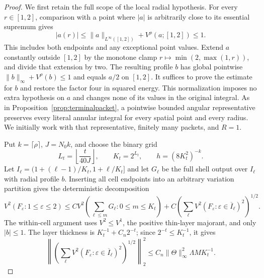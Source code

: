 \documentclass[11pt]{article}
\numberwithin{equation}{section}
\theoremstyle{remark}
\theoremstyle{definition}
\begin{document}
\begin{proof}
We first retain the full scope of the local radial hypothesis.  For
every $r\in[1,2]$, comparison with a point where $|a|$ is arbitrarily
close to its essential supremum gives
\[
 |a(r)|\le\|a\|_{L^\infty([1,2])}+V^\rho(a;[1,2])\le1.
\]
This includes both endpoints and any exceptional point values.  Extend
$a$ constantly outside $[1,2]$ by the monotone clamp
$r\mapsto\min(2,\max(1,r))$, and divide that extension by two.
The resulting profile $b$ has global pointwise
$\|b\|_\infty+V^\rho(b)\le1$ and equals $a/2$ on $[1,2]$.
It suffices to prove the estimate for $b$ and restore the factor four
in squared energy.  This normalization imposes no extra hypothesis
on $a$ and changes none of its values in the original integral.
As in Proposition~\ref{prop:terminalpacket}, a pointwise bounded angular
representative preserves every literal annular integral for every
spatial point and every radius.  We initially work with that
representative, finitely many packets, and $R=1$.

Put $k=\lceil\rho\rceil$, $J=N_0k$, and choose the binary grid
\[
 L_t=\left\lfloor\frac{t}{40J}\right\rfloor,
 \qquad K_t=2^{L_t},\qquad
 h=(8K_t^2)^{-k}.
\]
Let $I_\ell=(1+(\ell-1)/K_t,1+\ell/K_t]$ and let $G_\ell$
be the full shell output over $I_\ell$ with radial profile $b$.
Inserting all cell endpoints into an arbitrary variation partition
gives the deterministic decomposition
\[
 V^2(F_\varepsilon:1\le\varepsilon\le2)
 \le C V^2\left(\sum_{\ell\le m}G_\ell:0\le m\le K_t\right)
 +C\left(\sum_\ell V^2(F_\varepsilon:\varepsilon\in\overline I_\ell)^2\right)^{1/2}.
\]
The within-cell argument uses $V^2\le V^1$, the positive thin-layer
majorant, and only $|b|\le1$.  The layer thickness is
$K_t^{-1}+C_n2^{-t}$; since $2^{-t}\le K_t^{-1}$, it gives
\begin{equation}\label{eq:allq-terminal-within-cell}
 \left\|\left(\sum_\ell
 V^2(F_\varepsilon:\varepsilon\in\overline I_\ell)^2\right)^{1/2}\right\|_2^2
 \le C_n\|\Theta\|_\infty^2\Lambda M K_t^{-1}.
\end{equation}


\end{proof}
\end{document}
